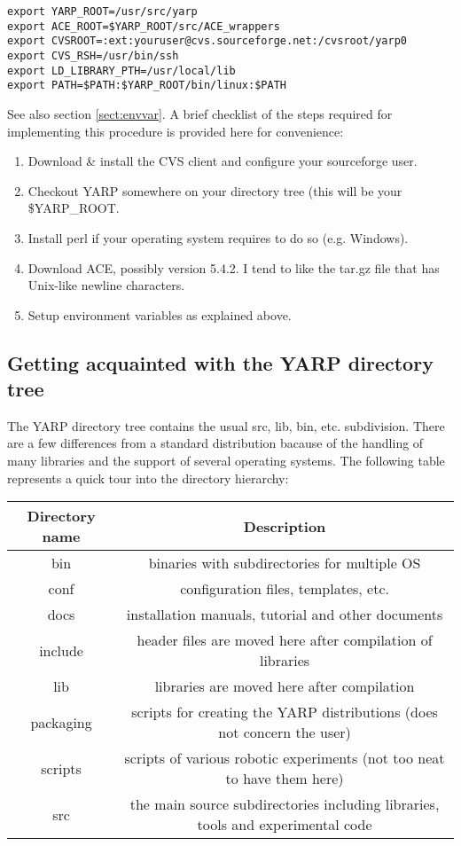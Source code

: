 \begin{verbatim}
export YARP_ROOT=/usr/src/yarp
export ACE_ROOT=$YARP_ROOT/src/ACE_wrappers
export CVSROOT=:ext:youruser@cvs.sourceforge.net:/cvsroot/yarp0
export CVS_RSH=/usr/bin/ssh
export LD_LIBRARY_PTH=/usr/local/lib
export PATH=$PATH:$YARP_ROOT/bin/linux:$PATH
\end{verbatim}

See also section \ref{sect:envvar}. A brief checklist of the steps required for implementing this procedure is provided here for convenience:
\begin{enumerate}
	\item Download \& install the CVS client and configure your sourceforge user.
	\item Checkout YARP  somewhere on your directory tree (this will be your \$YARP\_ROOT.
	\item Install perl if your operating system requires to do so (e.g. Windows).
	\item Download ACE, possibly version 5.4.2. I tend to like the tar.gz file that has Unix-like newline characters.
	\item Setup environment variables as explained above.
\end{enumerate}

\subsection{Getting acquainted with the YARP directory tree}
The YARP directory tree contains the usual src, lib, bin, etc. subdivision. There are a few differences from a standard distribution bacause of the handling of many libraries and the support of several operating systems. The following table represents a quick tour into the directory hierarchy:

\begin{table}[h]
	\centering
		\begin{tabular}{|c|c|}
		\hline
			Directory name & Description \\
			\hline \hline
			bin & binaries with subdirectories for multiple OS \\
			\hline
			conf & configuration files, templates, etc. \\
			\hline
			docs & installation manuals, tutorial and other documents \\
			\hline
			include & header files are moved here after compilation of libraries \\
			\hline
			lib & libraries are moved here after compilation \\
			\hline
			packaging & scripts for creating the YARP distributions (does not concern the user) \\
			\hline
			scripts & scripts of various robotic experiments (not too neat to have them here) \\
			\hline
			src & the main source subdirectories including libraries, tools and experimental code \\
			\hline
		\end{tabular}
\end{table}


